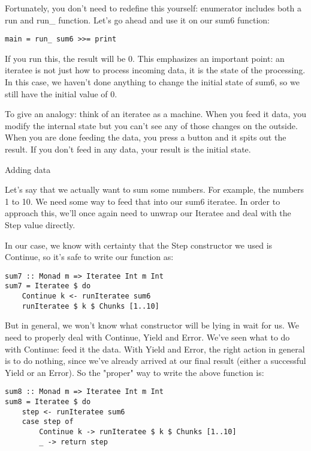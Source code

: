 Fortunately, you don't need to redefine this yourself: enumerator includes both a run and run_ function. Let's go ahead and use it on our sum6 function:

\begin{lstlisting}
main = run_ sum6 >>= print
\end{lstlisting}

If you run this, the result will be 0. This emphasizes an important point: an iteratee is not just how to process incoming data, it is the state of the processing. In this case, we haven't done anything to change the initial state of sum6, so we still have the initial value of 0.

To give an analogy: think of an iteratee as a machine. When you feed it data, you modify the internal state but you can't see any of those changes on the outside. When you are done feeding the data, you press a button and it spits out the result. If you don't feed in any data, your result is the initial state.

Adding data

Let's say that we actually want to sum some numbers. For example, the numbers 1 to 10. We need some way to feed that into our sum6 iteratee. In order to approach this, we'll once again need to unwrap our Iteratee and deal with the Step value directly.

In our case, we know with certainty that the Step constructor we used is Continue, so it's safe to write our function as:

\begin{lstlisting}
sum7 :: Monad m => Iteratee Int m Int
sum7 = Iteratee $ do
    Continue k <- runIteratee sum6
    runIteratee $ k $ Chunks [1..10]
\end{lstlisting}

But in general, we won't know what constructor will be lying in wait for us. We need to properly deal with Continue, Yield and Error. We've seen what to do with Continue: feed it the data. With Yield and Error, the right action in general is to do nothing, since we've already arrived at our final result (either a successful Yield or an Error). So the "proper" way to write the above function is:

\begin{lstlisting}
sum8 :: Monad m => Iteratee Int m Int
sum8 = Iteratee $ do
    step <- runIteratee sum6
    case step of
        Continue k -> runIteratee $ k $ Chunks [1..10]
        _ -> return step
\end{lstlisting}

